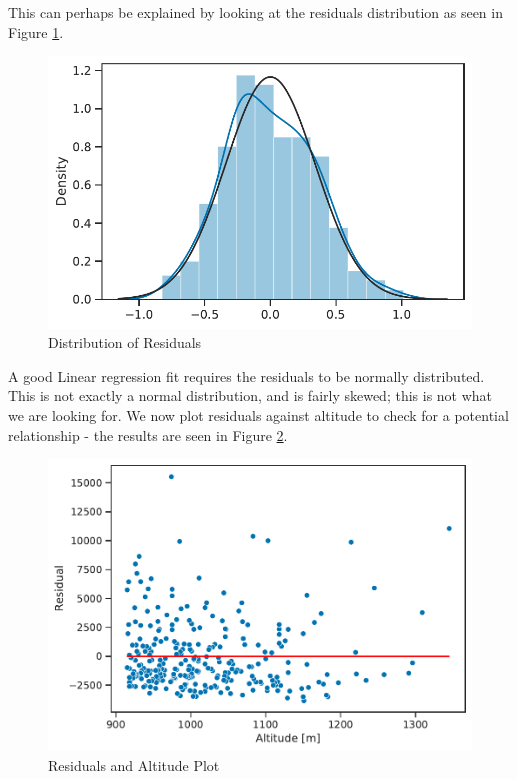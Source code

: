 \documentclass[11pt,a4paper]{article}
\begin{document}
\medskip

This can perhaps be explained by looking at the residuals distribution as seen in Figure \ref{fds-project-template:fig:residuals_dist}.

\begin{figure} [h!]
  \centering
  \includegraphics[scale = 0.7]{report/residuals_dist.pdf}
  \caption{Distribution of Residuals}
  \label{fds-project-template:fig:residuals_dist}
\end{figure}

A good Linear regression fit requires the residuals to be normally distributed. This is not exactly a normal distribution, and is fairly skewed; this is not what we are looking for. We now plot residuals against altitude to check for a potential relationship - the results are seen in Figure \ref{fds-project-template:fig:residuals_plot}.

\begin{figure} [h!]
  \centering
  \includegraphics[scale = 0.7]{report/residuals_plot.pdf}
  \caption{Residuals and Altitude Plot}
  \label{fds-project-template:fig:residuals_plot}
\end{figure}
\end{document}
